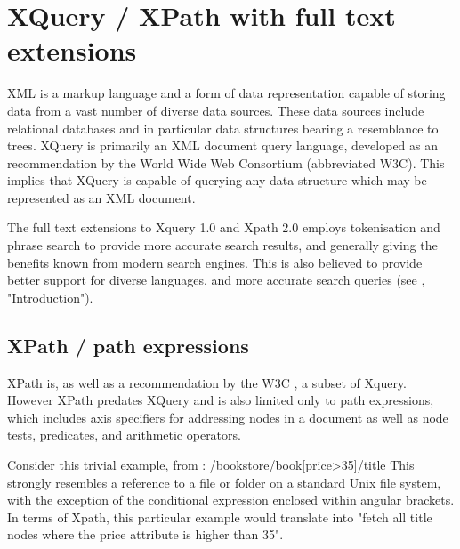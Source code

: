 \section{XQuery / XPath with full text extensions}
\label{sect:theory:xquery}
XML is a markup language and a form of data representation capable of storing data from a vast number of diverse data sources. These data sources include relational databases and in particular data structures bearing a resemblance to trees. XQuery is primarily an XML document query language, developed as an recommendation by the World Wide Web Consortium\cite{w3c00} (abbreviated W3C). This implies that XQuery is capable of querying any data structure which may be represented as an XML document.

The full text extensions to Xquery 1.0 and Xpath 2.0 employs tokenisation and phrase search to provide more accurate search results, and generally giving the benefits known from modern search engines. This is also believed to provide better support for diverse languages, and more accurate search queries (see \cite{w3c02}, "Introduction").

\subsection{XPath / path expressions}
XPath is, as well as a recommendation by the W3C \cite{w3c01}, a subset of Xquery. However XPath predates XQuery and is also limited only to path expressions, which includes axis specifiers for addressing nodes in a document as well as node tests, predicates, and arithmetic operators.

Consider this trivial example, from \cite{w3s00}:
/bookstore/book[price>35]/title
This strongly resembles a reference to a file or folder on a standard Unix file system, with the exception of the conditional expression enclosed within angular brackets. In terms of Xpath, this particular example would translate into "fetch all title nodes where the price attribute is higher than 35".

